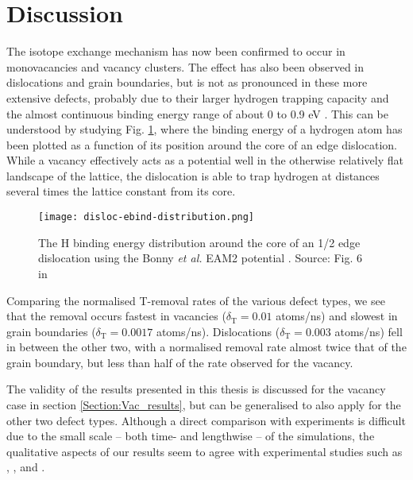 \section{Discussion}
The isotope exchange mechanism has now been confirmed to occur in monovacancies and vacancy clusters. 
The effect has also been observed in dislocations and grain boundaries, but is not as pronounced in these more extensive defects, probably due to their larger hydrogen trapping capacity and the almost continuous binding energy range of about 0 to 0.9 eV \cite{grigorev2015interaction}. 
This can be understood by studying Fig. \ref{Fig:Disloc_ebind_dist}, where the binding energy of a hydrogen atom has been plotted as a function of its position around the core of an edge dislocation. 
While a vacancy effectively acts as a potential well in the otherwise relatively flat landscape of the lattice, the dislocation is able to trap hydrogen at distances several times the lattice constant from its core.


\begin{figure}[!ht]
	\center
	\texttt{[image: disloc-ebind-distribution.png]}
	\caption{The H binding energy distribution around the core of an 1/2\hkl[1 1 1] edge dislocation using the Bonny \textit{et al.} EAM2 potential \cite{bonny2014many}. Source: Fig. 6 in \cite{grigorev2015interaction}}
	\label{Fig:Disloc_ebind_dist}
\end{figure}

Comparing the normalised T-removal rates of the various defect types, we see that the removal occurs fastest in vacancies ($\delta_{\text{T}} = 0.01$ atoms/ns) and slowest in grain boundaries ($\delta_{\text{T}} = 0.0017$ atoms/ns). 
Dislocations ($\delta_{\text{T}} = 0.003$ atoms/ns) fell in between the other two, with a normalised removal rate almost twice that of the grain boundary, but less than half of the rate observed for the vacancy.

The validity of the results presented in this thesis is discussed for the vacancy case in section \ref{Section:Vac_results}, but can be generalised to also apply for the other two defect types. 
Although a direct comparison with experiments is difficult due to the small scale -- both time- and lengthwise -- of the simulations, the qualitative aspects of our results seem to agree with experimental studies such as \cite{alimov2011hydrogen}, \cite{roth2013hydrogen}, \cite{barton2014deuterium} and \cite{ahlgren2019hydrogen}. 
